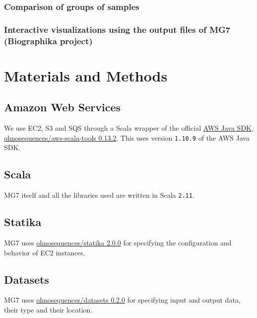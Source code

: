 \documentclass{frontiersSCNS} %
\begin{document}
\subsubsection{Comparison of groups of
samples}\label{comparison-of-groups-of-samples}

\subsubsection{Interactive visualizations using the output files of MG7
(Biographika
project)}\label{interactive-visualizations-using-the-output-files-of-mg7-biographika-project}

\section{Materials and Methods}\label{materials-and-methods}

\subsection{Amazon Web Services}\label{amazon-web-services}

We use EC2, S3 and SQS through a Scala wrapper of the official
\href{https://aws.amazon.com/sdk-for-java/}{AWS Java SDK},
\href{https://github.com/ohnosequences/aws-scala-tools/???}{ohnosequences/aws-scala-tools
0.13.2}. This uses version \texttt{1.10.9} of the AWS Java SDK.

\subsection{Scala}\label{scala}

MG7 itself and all the libraries used are written in Scala
\texttt{2.11}.

\subsection{Statika}\label{statika}

MG7 uses
\href{https://github.com/statika/statika/releases/tag/v0.2.0}{ohnosequences/statika
2.0.0} for specifying the configuration and behavior of EC2 instances.

\subsection{Datasets}\label{datasets}

MG7 uses
\href{https://github.com/ohnosequences/datasets/releases/tag/v0.2.0}{ohnosequences/datasets
0.2.0} for specifying input and output data, their type and their
location.
\end{document}
